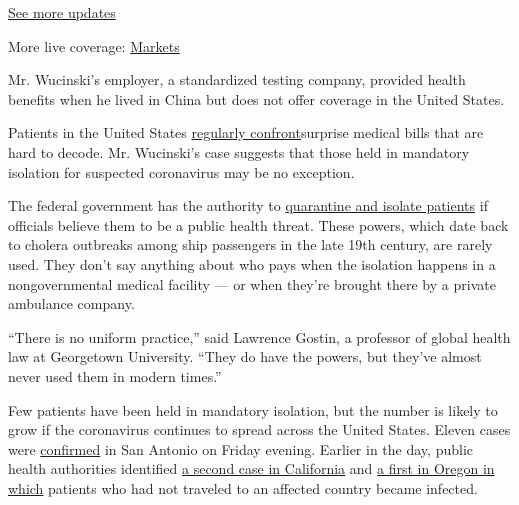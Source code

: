 \href{https://www.nytimes.com/2020/08/04/world/coronavirus-cases.html?action=click\&pgtype=Article\&state=default\&region=MAIN_CONTENT_1\&context=storylines_live_updates}{See
more updates}

More live coverage:
\href{https://www.nytimes.com/live/2020/08/04/business/stock-market-today-coronavirus?action=click\&pgtype=Article\&state=default\&region=MAIN_CONTENT_1\&context=storylines_live_updates}{Markets}

Mr. Wucinski's employer, a standardized testing company, provided health
benefits when he lived in China but does not offer coverage in the
United States.

Patients in the United States
\href{https://www.nytimes.com/2020/02/19/opinion/surprise-medical-bill.html}{regularly
confront}surprise medical bills that are hard to decode. Mr. Wucinski's
case suggests that those held in mandatory isolation for suspected
coronavirus may be no exception.

The federal government has the authority to
\href{https://www.cdc.gov/quarantine/historyquarantine.html}{quarantine
and isolate patients} if officials believe them to be a public health
threat. These powers, which date back to cholera outbreaks among ship
passengers in the late 19th century, are rarely used. They don't say
anything about who pays when the isolation happens in a nongovernmental
medical facility --- or when they're brought there by a private
ambulance company.

``There is no uniform practice,'' said Lawrence Gostin, a professor of
global health law at Georgetown University. ``They do have the powers,
but they've almost never used them in modern times.''

Few patients have been held in mandatory isolation, but the number is
likely to grow if the coronavirus continues to spread across the United
States. Eleven cases were
\href{https://www.click2houston.com/news/texas/2020/02/29/11-cases-of-coronavirus-confirmed-in-san-antonio/?utm_source=twitter\&utm_medium=social\&utm_campaign=snd\&utm_content=kprc2}{confirmed}
in San Antonio on Friday evening. Earlier in the day, public health
authorities identified
\href{https://www.nytimes.com/2020/02/28/us/coronavirus-solano-county.html?action=click\&module=RelatedLinks\&pgtype=Article}{a
second case in California} and
\href{https://www.nytimes.com/aponline/2020/02/28/us/ap-us-virus-outbreak-oregon-4th-ld-writethru.html?searchResultPosition=9}{a
first in Oregon in which} patients who had not traveled to an affected
country became infected.

